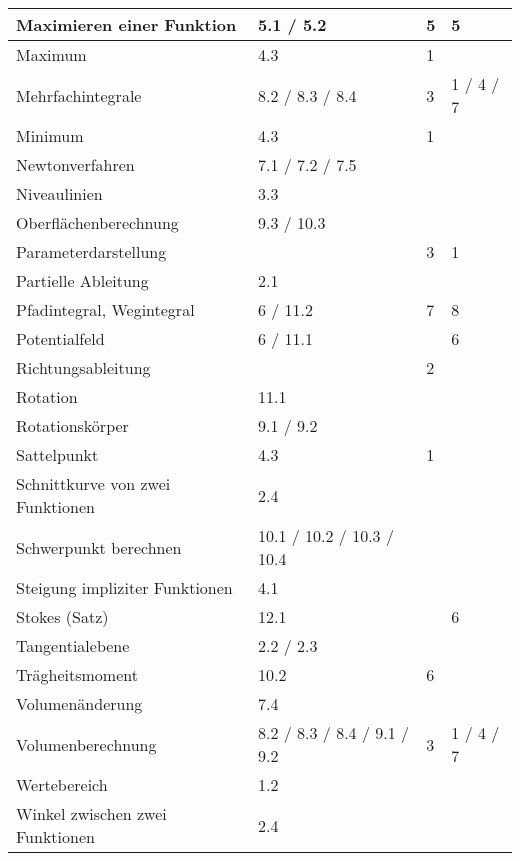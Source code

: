 \begin{tabular}{|l|l|l|l|}
Maximieren einer Funktion & 5.1 / 5.2 & 5 & 5 \\ \hline
Maximum & 4.3 & 1 &  \\ \hline
Mehrfachintegrale & 8.2 / 8.3 / 8.4 & 3 & 1 / 4 / 7 \\ \hline
Minimum & 4.3 & 1 &  \\ \hline
Newtonverfahren & 7.1 / 7.2 / 7.5 &  &  \\ \hline
Niveaulinien & 3.3 &  &  \\ \hline
Oberflächenberechnung & 9.3 / 10.3 &  &  \\ \hline
Parameterdarstellung &  & 3 & 1 \\ \hline
Partielle Ableitung & 2.1 &  &  \\ \hline
Pfadintegral, Wegintegral & 6 / 11.2 & 7 & 8 \\ \hline
Potentialfeld & 6 / 11.1 &  & 6 \\ \hline
Richtungsableitung &  & 2 &  \\ \hline
Rotation & 11.1 &  &  \\ \hline
Rotationskörper & 9.1 / 9.2 &  &  \\ \hline
Sattelpunkt & 4.3 & 1 &  \\ \hline
Schnittkurve von zwei Funktionen & 2.4 &  &  \\ \hline
Schwerpunkt berechnen & 10.1 / 10.2 / 10.3 / 10.4 &  &  \\ \hline
Steigung impliziter Funktionen & 4.1 &  &  \\ \hline
Stokes (Satz) & 12.1 &  & 6 \\ \hline
Tangentialebene & 2.2 / 2.3 &  &  \\ \hline
Trägheitsmoment & 10.2 & 6 &  \\ \hline
Volumenänderung & 7.4 &  &  \\ \hline
Volumenberechnung & 8.2 / 8.3 / 8.4 / 9.1 / 9.2 & 3 & 1 / 4 / 7 \\ \hline
Wertebereich & 1.2 &  &  \\ \hline
Winkel zwischen zwei Funktionen & 2.4 &  &  \\ \hline
\end{tabular}

\renewcommand{\arraystretch}{1}